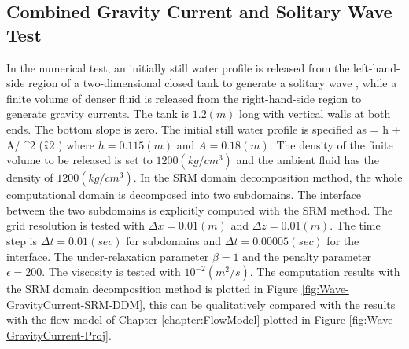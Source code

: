 \cp

\subsection{Combined Gravity Current and Solitary Wave Test}

In the numerical test, an initially still water profile is released from the left-hand-side region of a two-dimensional closed tank to generate a solitary wave \cite{Laitone1960}, while a finite volume of denser fluid is released from the right-hand-side region to generate gravity currents.
The tank is $1.2 (m)$ long with vertical walls at both ends. The bottom slope is zero. The initial still water profile \cite{The1994, Yue2003} is specified as
\be
\eta = h + A/ \cosh^2 (\f{x}{2} )
\ee
where $h=0.115 (m)$ and $A=0.18 (m)$. The density of the finite volume to be released is set to $1200 (kg/cm^3)$ and the ambient fluid has the density of $1200 (kg/cm^3)$.
In the SRM domain decomposition method, the whole computational domain is decomposed into two subdomains. The interface between the two subdomains is explicitly computed with the SRM method. The grid resolution is tested with $\Delta x = 0.01 (m)$ and $\Delta z = 0.01 (m)$. The time step is $\Delta t = 0.01 (sec)$ for subdomains and $\Delta t = 0.00005 (sec)$ for the interface. The under-relaxation parameter $\beta=1$ and the penalty parameter $\epsilon=200$. The viscosity is tested with $10^{-2} (m^2/s)$.
The computation results with the SRM domain decomposition method is plotted in Figure \ref{fig:Wave-GravityCurrent-SRM-DDM}, this can be qualitatively compared with the results with the flow model of Chapter \ref{chapter:FlowModel} plotted in Figure \ref{fig:Wave-GravityCurrent-Proj}.


